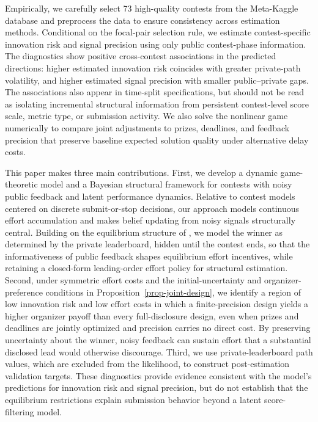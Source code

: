 \documentclass[mnsc]{informs3}
\begin{document}
Empirically, we carefully select 73 high-quality contests from the Meta-Kaggle database and preprocess the data to ensure consistency across estimation methods.
Conditional on the focal-pair selection rule, we estimate contest-specific innovation risk and signal precision using only public contest-phase information.
The diagnostics show positive cross-contest associations in the predicted directions: higher estimated innovation risk coincides with greater private-path volatility, and higher estimated signal precision with smaller public--private gaps. The associations also appear in time-split specifications, but should not be read as isolating incremental structural information from persistent contest-level score scale, metric type, or submission activity.
We also solve the nonlinear game numerically to compare joint adjustments to prizes, deadlines, and feedback precision that preserve baseline expected solution quality under alternative delay costs.


This paper makes three main contributions.
First, we develop a dynamic game-theoretic model and a Bayesian structural framework for contests with noisy public feedback and latent performance dynamics.
Relative to contest models centered on discrete submit-or-stop decisions, our approach models continuous effort accumulation and makes belief updating from noisy signals structurally central.
Building on the equilibrium structure of \citet{Ryvkin2022Fight}, we model the winner as determined by the private leaderboard, hidden until the contest ends, so that the informativeness of public feedback shapes equilibrium effort incentives, while retaining a closed-form leading-order effort policy for structural estimation.
{Second, under symmetric effort costs and the initial-uncertainty and organizer-preference conditions in Proposition~\ref{prop-joint-design}, we identify a region of low innovation risk and low effort costs in which a finite-precision design yields a higher organizer payoff than every full-disclosure design, even when prizes and deadlines are jointly optimized and precision carries no direct cost.} By preserving uncertainty about the winner, noisy feedback can sustain effort that a substantial disclosed lead would otherwise discourage.
Third, we use private-leaderboard path values, which are excluded from the likelihood, to construct post-estimation validation targets.
These diagnostics provide evidence consistent with the model's predictions for innovation risk and signal precision, but do not establish that the equilibrium restrictions explain submission behavior beyond a latent score-filtering model.
\end{document}
